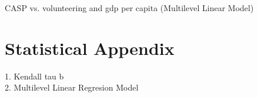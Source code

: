 \documentclass[10pt, letterpaper]{article}
\begin{document}
\begin{spacing}{1.4}
\begin{spacing}{.9}

\begin{spacing}{.9}
	 
      \label{CASP}
\end{spacing}


\begin{spacing}{.9}
	 
      \label{sphus}
\end{spacing}



\begin{spacing}{.9}
	 
      \label{tauH} 
\end{spacing}

\begin{spacing}{.9}
	 
      \label{tauLS} 
\end{spacing}


%	 




\begin{spacing}{.9}
\begin{table}[H]
\centering 
\caption{CASP vs. volunteering and gdp per capita (Multilevel Linear Model)}  
\begin{scriptsize} 
	 
      \label{regB} 
\end{scriptsize}
\end{table}
\end{spacing}

\section{Statistical Appendix}

1. Kendall tau b \\
2. Multilevel Linear Regresion Model

\end{spacing}
\end{spacing}
\end{document}
